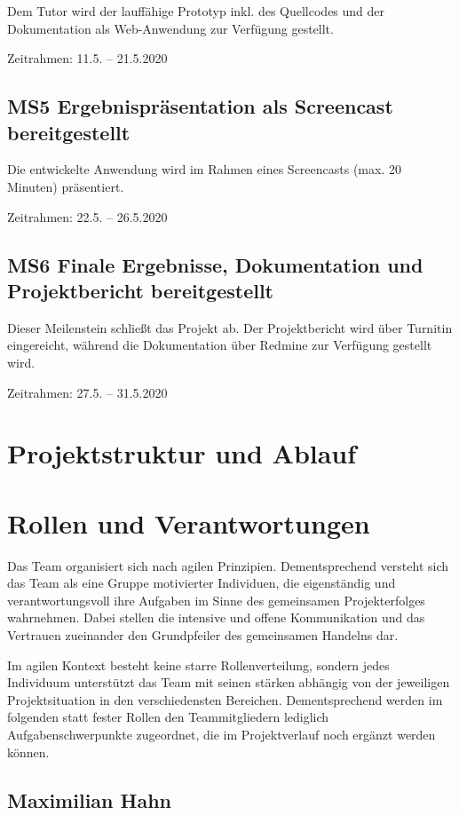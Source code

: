 \documentclass[a4paper,11pt,listof=numbered,glossary=totoc,parskip=half,toc=bib]{scrreprt}
\begin{document}
Dem Tutor wird der lauffähige Prototyp inkl. des Quellcodes und der Dokumentation als Web-Anwendung zur Verfügung gestellt.

Zeitrahmen: 11.5. -- 21.5.2020

\subsection{MS5 Ergebnispräsentation als Screencast bereitgestellt}

Die entwickelte Anwendung wird im Rahmen eines Screencasts (max. 20 Minuten) präsentiert.

Zeitrahmen: 22.5. -- 26.5.2020

\subsection{MS6 Finale Ergebnisse, Dokumentation und Projektbericht bereitgestellt}

Dieser Meilenstein schließt das Projekt ab. Der Projektbericht wird über Turnitin eingereicht, während die Dokumentation über Redmine zur Verfügung gestellt wird.

Zeitrahmen: 27.5. -- 31.5.2020

	\newpage
	\section{Projektstruktur und Ablauf}

	\newpage
	\section{Rollen und Verantwortungen}	

Das Team organisiert sich nach agilen Prinzipien. Dementsprechend versteht sich das Team als eine Gruppe motivierter Individuen, die eigenständig und verantwortungsvoll ihre Aufgaben im Sinne des gemeinsamen Projekterfolges wahrnehmen. Dabei stellen die intensive und offene Kommunikation und das Vertrauen zueinander den Grundpfeiler des gemeinsamen Handelns dar.

Im agilen Kontext besteht keine starre Rollenverteilung, sondern jedes Individuum unterstützt das Team mit seinen stärken abhängig von der jeweiligen Projektsituation in den verschiedensten Bereichen.
Dementsprechend werden im folgenden statt fester Rollen den Teammitgliedern lediglich Aufgabenschwerpunkte zugeordnet, die im Projektverlauf noch ergänzt werden können.

\subsection{Maximilian Hahn}
\end{document}
